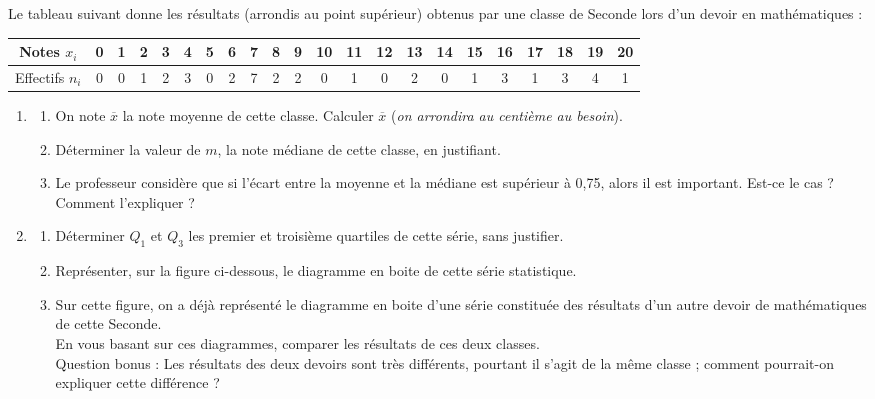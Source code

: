 \begin{exo}[6 points]\label{ds5exo2}
Le tableau suivant donne les r\'esultats (arrondis au point sup\'erieur)  obtenus par une classe de
Seconde lors d'un devoir en math\'ematiques :
\vspace{-1.5em}\begin{center}
\begin{tabular}{|*{22}{c|}}
\hline
Notes $x_i$ 	 & 0 & 1 & 2 & 3 & 4 & 5 & 6 & 7&  8 & 9 &10 &11 &12& 13 &14& 15
&16& 17& 18 &19 &20 \\ \hline
Effectifs $n_i$ & 0 & 0 & 1 & 2 & 3 & 0 & 2 & 7&  2 & 2 & 0 & 1 & 0& 2  &0 &1 &3& 1& 3& 4& 1\\ \hline
\end{tabular}
\end{center}
\begin{enumerate}
        \item \begin{enumerate}
	      \item On note $\overline{x}$ la note moyenne de cette classe. Calculer $\overline{x}$
(\emph{on arrondira au centi\`eme au besoin}).
	      \item D\'eterminer la valeur de $m$, la note m\'ediane de cette classe, en justifiant.
	      \item Le professeur consid\`ere que si l'\'ecart entre la moyenne et la m\'ediane est sup\'erieur \`a 0,75, alors il est important. 
	      Est-ce le cas ? Comment l'expliquer ?
	      \end{enumerate}
       \item \begin{enumerate}
	      \item D\'eterminer $Q_1$ et $Q_3$ les premier et
troisi\`eme quartiles de cette s\'erie, sans justifier.
	      \item Repr\'esenter, sur la figure ci-dessous, le diagramme en boite de cette s\'erie statistique.
	      \item Sur cette figure, on a d\'ej\`a repr\'esent\'e le diagramme en boite d'une s\'erie constitu\'ee des r\'esultats
d'un autre devoir de math\'ematiques de cette Seconde.\\
En vous basant sur ces diagrammes, comparer les r\'esultats de ces deux classes.\\
Question bonus : Les r\'esultats des deux devoirs sont tr\`es diff\'erents, pourtant il s'agit de la m\^eme classe ; comment pourrait-on expliquer cette diff\'erence ?
	      \end{enumerate}
      \end{enumerate}


\end{exo}
